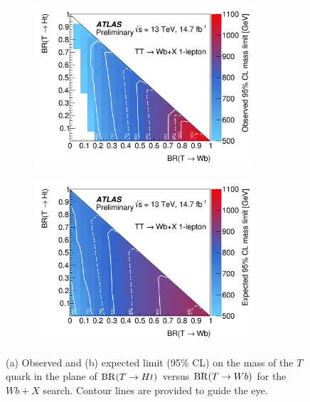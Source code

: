 \begin{figure}[h!]
\begin{subfigure}{0.5\textwidth}
  \centering
  \includegraphics[width=0.9\textwidth]{figures/VLQ/Wbb.png}
  \caption{}
  \label{}
\end{subfigure}
\begin{subfigure}{0.5\textwidth}
  \centering
  \includegraphics[width=0.9\textwidth]{figures/VLQ/Wba.png}
  \caption{}
  \label{}
\end{subfigure}
\captionsetup{width=0.85\textwidth} \caption{\small (a) Observed and (b) expected limit (95\% CL) on the mass of the $T$ quark in the plane 
of ${\rm BR}(T \to Ht)$ versus ${\rm BR}(T \to Wb)$ for the $Wb+X$ search. 
Contour lines are provided to guide the eye.}
\label{sec:vlq:fig:Wb}
\end{figure}


